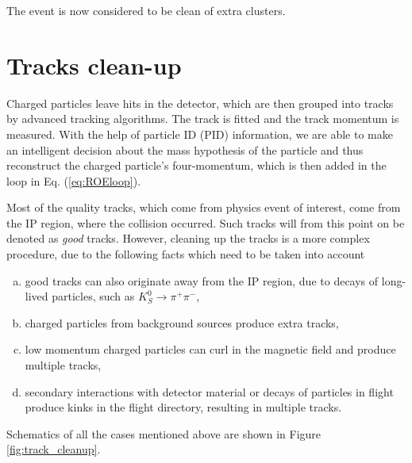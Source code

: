 \documentclass[oneside,a4paper,openany,12pt]{scrbook}
\begin{document}
The event is now considered to be clean of extra clusters.

\section{Tracks clean-up}

Charged particles leave hits in the detector, which are then grouped into tracks by advanced tracking algorithms. The track is fitted and the track momentum is measured. With the help of particle ID (PID) information, we are able to make an intelligent decision about the mass hypothesis of the particle and thus reconstruct the charged particle's four-momentum, which is then added in the loop in Eq. (\ref{eq:ROEloop}).

Most of the quality tracks, which come from physics event of interest, come from the IP region, where the collision occurred. Such tracks will from this point on be denoted as \textit{good} tracks. However, cleaning up the tracks is a more complex procedure, due to the following facts which need to be taken into account
\begin{enumerate}[(a)]
\item good tracks can also originate away from the IP region, due to decays of long-lived particles, such as $K_S^0 \to \pi^+ \pi^-$,
\item charged particles from background sources produce extra tracks,
\item low momentum charged particles can curl in the magnetic field and produce multiple tracks,
\item secondary interactions with detector material or decays of particles in flight produce kinks in the flight directory, resulting in multiple tracks.
\end{enumerate}

Schematics of all the cases mentioned above are shown in Figure \ref{fig:track_cleanup}.
\end{document}
